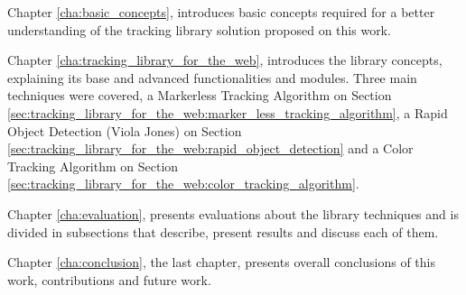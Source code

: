 Chapter \ref{cha:basic_concepts}, introduces basic concepts required for a better understanding of the tracking library solution proposed on this work.

Chapter \ref{cha:tracking_library_for_the_web}, introduces the library concepts, explaining its base and advanced functionalities and modules. Three main techniques were covered, a Markerless Tracking Algorithm on Section \ref{sec:tracking_library_for_the_web:marker_less_tracking_algorithm}, a Rapid Object Detection (Viola Jones) on Section \ref{sec:tracking_library_for_the_web:rapid_object_detection} and a Color Tracking Algorithm on Section \ref{sec:tracking_library_for_the_web:color_tracking_algorithm}.

Chapter \ref{cha:evaluation}, presents evaluations about the library techniques and is divided in subsections that describe, present results and discuss each of them.

Chapter \ref{cha:conclusion}, the last chapter, presents overall conclusions of this work, contributions and future work.


